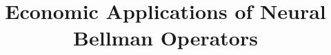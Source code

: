\documentclass[ecta,nameyear,draft]{econsocart}
\theoremstyle{definition}
\theoremstyle{remark}
\begin{document}
\begin{frontmatter}
\title{Economic Applications of Neural Bellman Operators}
\begin{aug}
\author[id=au1,addressref={add1}]{~}
\address[id=add1]{Peking University}
\end{aug}
\end{frontmatter}




\end{document}

